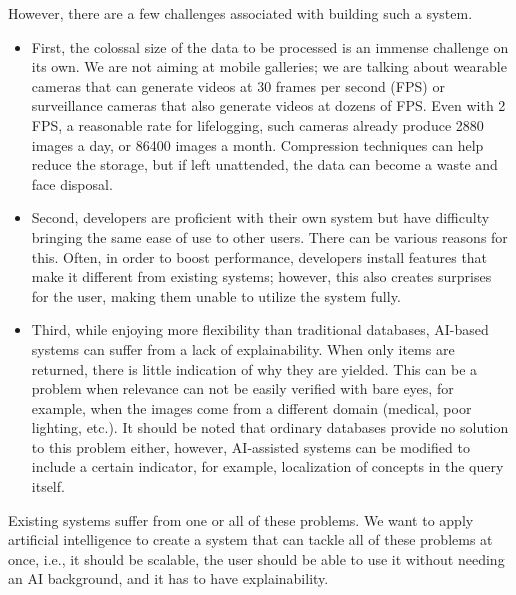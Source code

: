 However, there are a few challenges associated with building such a system.
\begin{itemize}
\vspace{-2mm}
    \item First, the colossal size of the data to be processed is an immense challenge on its own. We are not aiming at mobile galleries; we are talking about wearable cameras that can generate videos at 30 frames per second (FPS) or surveillance cameras that also generate videos at dozens of FPS. Even with 2 FPS, a reasonable rate for lifelogging, such cameras already produce 2880 images a day, or 86400 images a month. Compression techniques can help reduce the storage, but if left unattended, the data can become a waste and face disposal.
\vspace{-2mm}
    \item Second, developers are proficient with their own system but have difficulty bringing the same ease of use to other users. There can be various reasons for this. Often, in order to boost performance, developers install features that make it different from existing systems; however, this also creates surprises for the user, making them unable to utilize the system fully.
\vspace{-2mm}    
    \item Third, while enjoying more flexibility than traditional databases, AI-based systems can suffer from a lack of explainability. When only items are returned, there is little indication of why they are yielded. This can be a problem when relevance can not be easily verified with bare eyes, for example, when the images come from a different domain (medical, poor lighting, etc.). It should be noted that ordinary databases provide no solution to this problem either, however, AI-assisted systems can be modified to include a certain indicator, for example, localization of concepts in the query itself.
\end{itemize}

\vspace{-2mm}
Existing systems suffer from one or all of these problems. We want to apply artificial intelligence to create a system that can tackle all of these problems at once, i.e., it should be scalable, the user should be able to use it without needing an AI background, and it has to have explainability.


